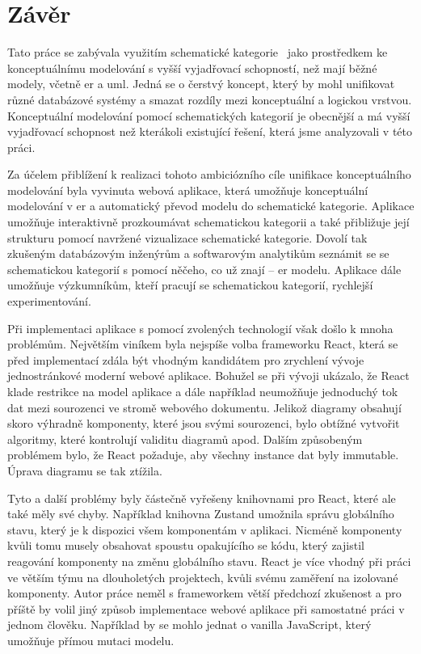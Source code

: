 \chapter*{Závěr}

Tato práce se zabývala využitím schematické kategorie~\cite{svoboda_categorical_2021} jako prostředkem ke konceptuálnímu modelování s vyšší vyjadřovací schopností, než mají běžné modely, včetně \acrshort{er} a \acrshort{uml}.
Jedná se o čerstvý koncept, který by mohl unifikovat různé databázové systémy a smazat rozdíly mezi konceptuální a logickou vrstvou.
Konceptuální modelování pomocí schematických kategorií je obecnější a má vyšší vyjadřovací schopnost než kterákoli existující řešení, která jsme analyzovali v této práci.

Za účelem přiblížení k realizaci tohoto ambiciózního cíle unifikace konceptuálního modelování byla vyvinuta webová aplikace, která umožňuje konceptuální modelování v \acrshort{er} a automatický převod modelu do schematické kategorie.
Aplikace umožňuje interaktivně prozkoumávat schematickou kategorii a také přibližuje její strukturu pomocí navržené vizualizace schematické kategorie.
Dovolí tak zkušeným databázovým inženýrům a softwarovým analytikům seznámit se se schematickou kategorií s pomocí něčeho, co už znají -- \acrshort{er} modelu.
Aplikace dále umožňuje výzkumníkům, kteří pracují se schematickou kategorií, rychlejší experimentování.

Při implementaci aplikace s pomocí zvolených technologií však došlo k mnoha problémům.
Největším viníkem byla nejspíše volba frameworku React, která se před implementací zdála být vhodným kandidátem pro zrychlení vývoje jednostránkové moderní webové aplikace.
Bohužel se při vývoji ukázalo, že React klade restrikce na model aplikace a dále například neumožňuje jednoduchý tok dat mezi sourozenci ve stromě webového dokumentu.
Jelikož diagramy obsahují skoro výhradně komponenty, které jsou svými sourozenci, bylo obtížné vytvořit algoritmy, které kontrolují validitu diagramů apod.
Dalším způsobeným problémem bylo, že React požaduje, aby všechny instance dat byly immutable.
Úprava diagramu se tak ztížila.

Tyto a další problémy byly částečně vyřešeny knihovnami pro React, které ale také měly své chyby.
Například knihovna Zustand umožnila správu globálního stavu, který je k dispozici všem komponentám v aplikaci.
Nicméně komponenty kvůli tomu musely obsahovat spoustu opakujícího se kódu, který zajistil reagování komponenty na změnu globálního stavu.
React je více vhodný při práci ve větším týmu na dlouholetých projektech, kvůli svému zaměření na izolované komponenty.
Autor práce neměl s frameworkem větší předchozí zkušenost a pro příště by volil jiný způsob implementace webové aplikace při samostatné práci v jednom člověku.
Například by se mohlo jednat o vanilla JavaScript, který umožňuje přímou mutaci modelu.

